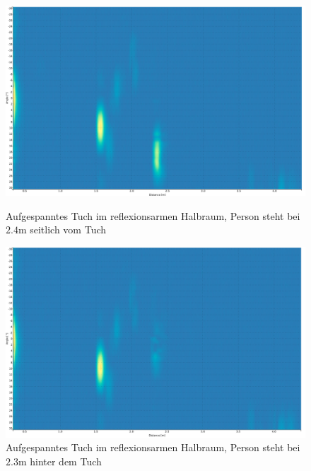 \clearpage
\begin{figure}[htb]
\begin{minipage}{1.0\textwidth}
\includegraphics[width=\textwidth]{graphics/image_appendix_bild_2.png}
\caption{Aufgespanntes Tuch im reflexionsarmen Halbraum, Person steht bei $2.4 \mathrm{m}$ seitlich vom Tuch} %
\label{fig:image_appendix_bild_2}
%
\end{minipage}
\begin{minipage}{1.0\textwidth}
\includegraphics[width=\textwidth]{graphics/image_appendix_bild_3.png}
\caption{Aufgespanntes Tuch im reflexionsarmen Halbraum, Person steht bei $2.3 \mathrm{m}$ hinter dem Tuch} %
\label{fig:image_appendix_bild_3}
%
\end{minipage}
\end{figure}


